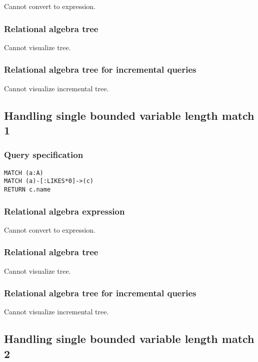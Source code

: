 Cannot convert to expression.

\subsubsection*{Relational algebra tree}

Cannot visualize tree.

\subsubsection*{Relational algebra tree for incremental queries}

Cannot visualize incremental tree.

\subsection{Handling single bounded variable length match 1}

\subsubsection*{Query specification}

\begin{lstlisting}
MATCH (a:A)
MATCH (a)-[:LIKES*0]->(c)
RETURN c.name
\end{lstlisting}

\subsubsection*{Relational algebra expression}

Cannot convert to expression.

\subsubsection*{Relational algebra tree}

Cannot visualize tree.

\subsubsection*{Relational algebra tree for incremental queries}

Cannot visualize incremental tree.

\subsection{Handling single bounded variable length match 2}

